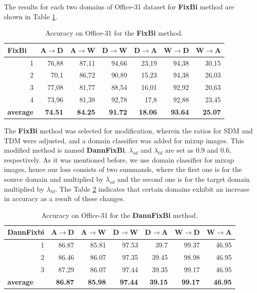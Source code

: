 The results for each two domains of Office-31 dataset for \textbf{FixBi} method are shown in Table \ref{tab:fixbi}.
\begin{table}[h]
\centering
\caption{Accuracy on Office-31 for the \textbf{FixBi} method.}
\label{tab:fixbi}
\begin{tabular}{|r|r|r|r|r|r|r|}
\hline
\multicolumn{1}{|l|}{FixBi} & \multicolumn{1}{l|}{A$\rightarrow$D} & \multicolumn{1}{l|}{A$\rightarrow$W} & \multicolumn{1}{l|}{D$\rightarrow$W} & \multicolumn{1}{l|}{D$\rightarrow$A} & \multicolumn{1}{l|}{W$\rightarrow$D} & \multicolumn{1}{l|}{W$\rightarrow$A} \\ \hline
1 & 76,88 & 87,11 & 94,66 & 23,19 & 94,38 & 30,15 \\ \hline
2 & 70,1 & 86,72 & 90,89 & 15,23 & 94,38 & 26,03 \\ \hline
3 & 77,08 & 81,77 & 88,54 & 16,01 & 92,92 & 20,63 \\ \hline
4 & 73,96 & 81,38 & 92,78 & 17,8 & 92,88 & 23,45 \\ \hline
\multicolumn{1}{|l|}{\textbf{average}} & \textbf{74.51} & \textbf{84.25} & \textbf{91.72} & \textbf{18.06} & \textbf{93.64} & \textbf{25.07} \\ \hline
\end{tabular}
\end{table}

The \textbf{FixBi} method was selected for modification, wherein the ratios for SDM and TDM were adjusted, and a domain classifier was added for mixup images. This modified method is named \textbf{DannFixBi}. $\lambda_{sd}$ and $\lambda_{td}$ are set as $0.9$ and $0.6$, respectively. As it was mentioned before, we use domain classifier for mixup images, hence our loss consists of two summands, where the first one is for the source domain and multiplied by $\lambda_{sd}$ and the second one is for the target domain multiplied by $\lambda_{td}$. The Table \ref{tab:dann_fixbi} indicates that certain domains exhibit an increase in accuracy as a result of these changes.


\begin{table}[h]
\centering
\caption{Accuracy on Office-31 for the \textbf{DannFixBi} method.}
\label{tab:dann_fixbi}
\begin{tabular}{|r|r|r|r|r|r|r|}
\hline
\multicolumn{1}{|l|}{DannFixbi} & \multicolumn{1}{l|}{A$\rightarrow$D} & \multicolumn{1}{l|}{A$\rightarrow$W} & \multicolumn{1}{l|}{D$\rightarrow$W} & \multicolumn{1}{l|}{D$\rightarrow$A} & \multicolumn{1}{l|}{W$\rightarrow$D} & \multicolumn{1}{l|}{W$\rightarrow$A} \\ \hline
1 & 86.87 & 85.81 & 97.53 & 39.7 & 99.37 & 46.95 \\ \hline
2 & 86.46 & 86.07 & 97.35 & 39.45 & 98.98 & 46.95 \\ \hline
3 & 87.29 & 86.07 & 97.44 & 39.35 & 99.17 & 46.95 \\ \hline
\multicolumn{1}{|l|}{\textbf{average}} & \textbf{86.87} & \textbf{85.98} & \textbf{97.44} & \textbf{39.15} & \textbf{99.17} & \textbf{46.95} \\ \hline
\end{tabular}
\end{table}

